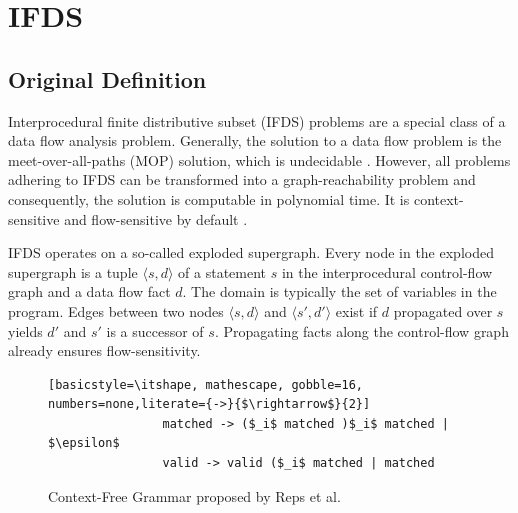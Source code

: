 \documentclass[../draft.tex]{subfiles}
\begin{document}
    \section{IFDS}\label{s:bigifds}
    \subsection{Original Definition}\label{s:ifds}
    Interprocedural finite distributive subset (IFDS) problems are a special class of a data flow analysis problem. 
    Generally, the solution to a data flow problem is the meet-over-all-paths (MOP) solution, which is undecidable \cite{Rice1953}. 
    However, all problems adhering to IFDS can be transformed into a graph-reachability problem and consequently, the solution is computable in polynomial time. 
    It is context-sensitive and flow-sensitive by default \cite{Reps1995}.

    IFDS operates on a so-called exploded supergraph. 
    Every node in the exploded supergraph is a tuple $\langle s, d \rangle$ of a statement $s$ in the interprocedural control-flow graph and a data flow fact $d$. 
    The domain is typically the set of variables in the program. 
    Edges between two nodes $\langle s, d \rangle$ and $\langle s', d' \rangle$ exist if $d$ propagated over $s$ yields $d'$ and $s'$ is a successor of $s$. 
    Propagating facts along the control-flow graph already ensures flow-sensitivity.

    \begin{figure}[ht]
        \centering
        \begin{adjustbox}{max width=\columnwidth}
            \begin{lstlisting}[basicstyle=\itshape, mathescape, gobble=16, numbers=none,literate={->}{$\rightarrow$}{2}]
                matched -> ($_i$ matched )$_i$ matched | $\epsilon$
                valid -> valid ($_i$ matched | matched
            \end{lstlisting}
        \end{adjustbox}
        \caption{Context-Free Grammar proposed by Reps et al.\cite{Reps1995}}
        \label{lst:cfl}
    \end{figure}
\end{document}
